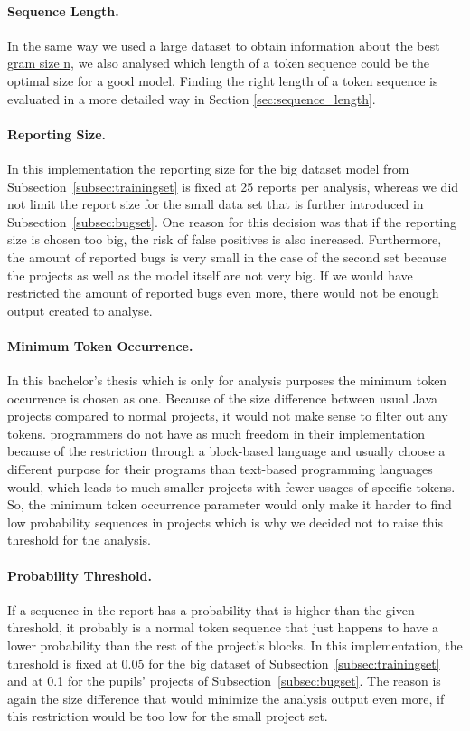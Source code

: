 \paragraph{Sequence Length.}
In the same way we used a large dataset to obtain information about the best \hyperref[def:gram_size]{gram size n}, we also analysed which length of a token sequence could be the optimal size for a good model. Finding the right length of a token sequence is evaluated in a more detailed way in Section \ref{sec:sequence_length}.
\paragraph{Reporting Size.}
In this implementation the reporting size for the big dataset model from Subsection~\ref{subsec:trainingset} is fixed at 25 reports per analysis, whereas we did not limit the report size for the small data set that  is further introduced in Subsection~\ref{subsec:bugset}. One reason for this decision was that if the reporting size is chosen too big, the risk of false positives is also increased. Furthermore, the amount of reported bugs is very small in the case of the second set because the projects as well as the model itself are not very big. If we would have restricted the amount of reported bugs even more, there would not be enough output created to analyse.  
\paragraph{Minimum Token Occurrence.}
In this bachelor's thesis \ngram{} which is only for \scratch{} analysis purposes the minimum token occurrence is chosen as one. Because of the size difference between usual Java projects compared to normal \scratch{} projects, it would not make sense to filter out any tokens. \scratch{} programmers do not have as much freedom in their implementation because of the restriction through a block-based language and usually choose a different purpose for their programs than text-based programming languages would, which leads to much smaller projects with fewer usages of specific tokens. So, the minimum token occurrence parameter would only make it harder to find low probability sequences in projects which is why we decided not to raise this threshold for the analysis.
\paragraph{Probability Threshold.}
If a sequence in the report has a probability that is higher than the given threshold, it probably is a normal token sequence that just happens to have a lower probability than the rest of the project's blocks. In this implementation, the threshold is fixed at 0.05 for the big dataset of Subsection~\ref{subsec:trainingset} and at 0.1 for the pupils' projects of Subsection~\ref{subsec:bugset}. The reason is again the size difference that would minimize the analysis output even more, if this restriction would be too low for the small project set.

